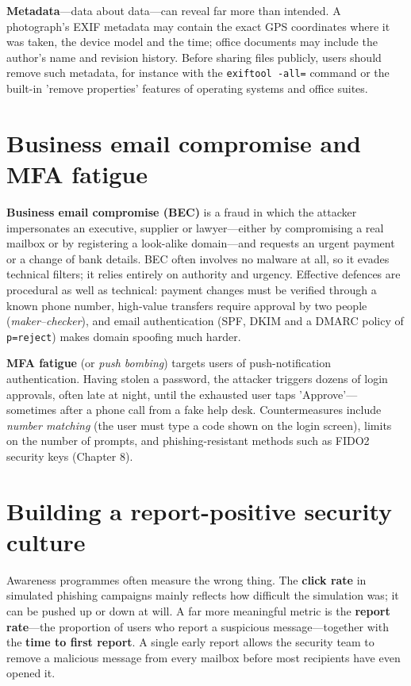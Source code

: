 \documentclass[11pt,openany]{book}
\begin{document}
\textbf{Metadata}—data about data—can reveal far more than intended. A photograph's EXIF metadata may contain the exact GPS coordinates where it was taken, the device model and the time; office documents may include the author's name and revision history. Before sharing files publicly, users should remove such metadata, for instance with the \texttt{exiftool -all=} command or the built-in 'remove properties' features of operating systems and office suites.

\section{Business email compromise and MFA fatigue}\label{sec:5.5}
\textbf{Business email compromise (BEC)} is a fraud in which the attacker impersonates an executive, supplier or lawyer—either by compromising a real mailbox or by registering a look-alike domain—and requests an urgent payment or a change of bank details. BEC often involves no malware at all, so it evades technical filters; it relies entirely on authority and urgency. Effective defences are procedural as well as technical: payment changes must be verified through a known phone number, high-value transfers require approval by two people (\emph{maker–checker}), and email authentication (SPF, DKIM and a DMARC policy of \texttt{p=reject}) makes domain spoofing much harder.

\textbf{MFA fatigue} (or \emph{push bombing}) targets users of push-notification authentication. Having stolen a password, the attacker triggers dozens of login approvals, often late at night, until the exhausted user taps 'Approve'—sometimes after a phone call from a fake help desk. Countermeasures include \emph{number matching} (the user must type a code shown on the login screen), limits on the number of prompts, and phishing-resistant methods such as FIDO2 security keys (Chapter 8).

\section{Building a report-positive security culture}\label{sec:5.6}
Awareness programmes often measure the wrong thing. The \textbf{click rate} in simulated phishing campaigns mainly reflects how difficult the simulation was; it can be pushed up or down at will. A far more meaningful metric is the \textbf{report rate}—the proportion of users who report a suspicious message—together with the \textbf{time to first report}. A single early report allows the security team to remove a malicious message from every mailbox before most recipients have even opened it.
\end{document}

